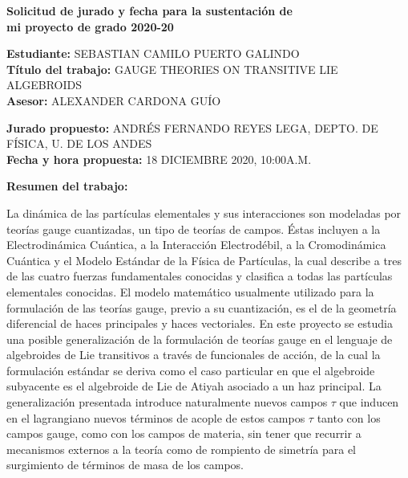 \documentclass{article}
\begin{document}
\begin{center}
   \bf\Large Solicitud de jurado y fecha para la sustentaci\'on de\\
   mi proyecto de grado 2020-20
\end{center}
\bigskip
\bigskip
\bigskip

\noindent
{\bf Estudiante:} SEBASTIAN CAMILO PUERTO GALINDO\\
{\bf T\'itulo del trabajo:} GAUGE THEORIES ON TRANSITIVE LIE ALGEBROIDS\\
{\bf Asesor:} ALEXANDER CARDONA GUÍO\\
\bigskip


\noindent
{\bf Jurado propuesto:} ANDRÉS FERNANDO REYES LEGA, DEPTO. DE FÍSICA, U. DE LOS ANDES\\
{\bf Fecha y hora propuesta:} 18 DICIEMBRE 2020, 10:00A.M.
\bigskip

\noindent


\smallskip

\noindent
{\bf Resumen del trabajo:}


\noindent

La dinámica de las partículas elementales y sus interacciones son modeladas por teorías gauge cuantizadas, un tipo de teorías de campos. Éstas incluyen a la Electrodinámica Cuántica, a la Interacción Electrodébil, a la Cromodinámica Cuántica y el Modelo Estándar de la Física de Partículas, la cual describe a tres de las cuatro fuerzas fundamentales conocidas y clasifica a todas las partículas elementales conocidas. El modelo matemático usualmente utilizado para la formulación de las teorías gauge, previo a su cuantización, es el de la geometría diferencial de haces principales y haces vectoriales. En este proyecto se estudia una posible generalización de la formulación de teorías gauge en el lenguaje de algebroides de Lie transitivos a través de funcionales de acción, de la cual la formulación estándar se deriva como el caso particular en que el algebroide subyacente es el algebroide de Lie de Atiyah asociado a un haz principal. La generalización presentada introduce naturalmente nuevos campos $\tau$ que inducen en el lagrangiano nuevos términos de acople de estos campos $\tau$ tanto con los campos gauge, como con los campos de materia, sin tener que recurrir a mecanismos externos a la teoría como de rompiento de simetría para el surgimiento de términos de masa de los campos.
\end{document}
